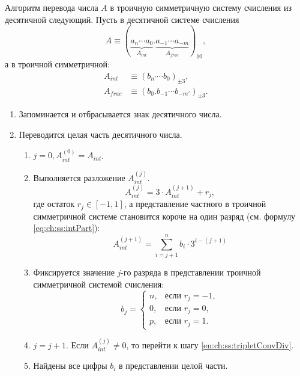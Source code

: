 Алгоритм перевода числа $A$ в троичную симметричную систему счисления из десятичной следующий. Пусть в десятичной системе счисления
\[
    A \equiv (\underbrace{a_{n}\cdots a_0}_{A_{int}}.\underbrace{a_{-1}\cdots a_{-m}}_{A_{frac}})_{10},
\]
а в троичной симметричной:
\begin{align*}
    A_{int}  &\equiv (b_{n'}\cdots b_0)_{\pm 3},\\
    A_{frac} &\equiv (b_0.b_{-1}\cdots b_{-m'})_{\pm 3}.
\end{align*}

\begin{enumerate}
    \item\label{en:ch:ss:tripletConvSign} Запоминается и отбрасывается знак десятичного числа.

    \item\label{en:ch:ss:tripletConvIntStart} Переводится целая часть десятичного числа.
    \begin{enumerate}
        \item $j=0, A_{int}^{(0)}=A_{int}$.

        \item \label{en:ch:ss:tripletConvDiv}
        Выполняется разложение $A_{int}^{(j)}$.
        \[
            A_{int}^{(j)}=3\cdot A_{int}^{(j+1)} + r_{j},
        \]
        где остаток $r_{j}\in[-1,1]$, а представление частного в троичной симметричной системе становится короче на один разряд (см. формулу \eqref{eq:ch:ss:intPart}):
        \[
            A_{int}^{(j+1)} = \sum_{i=j+1}^{n}b_{i}\cdot 3^{i-(j+1)}
        \]

        \item Фиксируется значение $j$-го разряда в представлении троичной симметричной системой счисления:
        \[
            b_j=
            \begin{cases}
                n, &\text{если $r_j=-1$},\\
                0, &\text{если $r_j=0$},\\
                p, &\text{если $r_j=1$}.
            \end{cases}
        \]
        
        \item $j=j+1$.
        Если $A_{int}^{(j)}\neq 0$, то перейти к шагу \ref{en:ch:ss:tripletConvDiv}.

        \item Найдены все цифры $b_{i}$ в представлении целой части.
    \end{enumerate}


\end{enumerate}
